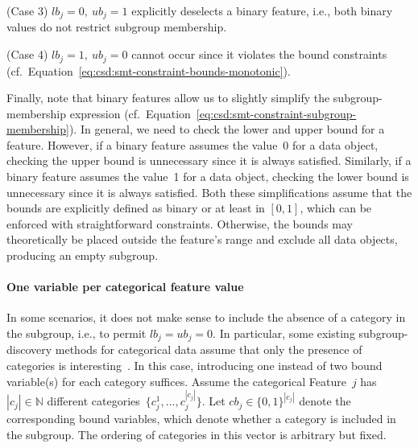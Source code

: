 \documentclass{article}
\theoremstyle{definition}
\begin{document}
(Case 3) $\mathit{lb}_j = 0,~\mathit{ub}_j = 1$ explicitly deselects a binary feature, i.e., both binary values do not restrict subgroup membership.

(Case 4) $\mathit{lb}_j = 1,~\mathit{ub}_j = 0$ cannot occur since it violates the bound constraints (cf.~Equation~\ref{eq:csd:smt-constraint-bounds-monotonic}).

Finally, note that binary features allow us to slightly simplify the subgroup-membership expression (cf.~Equation~\ref{eq:csd:smt-constraint-subgroup-membership}).
In general, we need to check the lower and upper bound for a feature.
However, if a binary feature assumes the value~0 for a data object, checking the upper bound is unnecessary since it is always satisfied.
Similarly, if a binary feature assumes the value~1 for a data object, checking the lower bound is unnecessary since it is always satisfied.
Both these simplifications assume that the bounds are explicitly defined as binary or at least in $[0, 1]$, which can be enforced with straightforward constraints.
Otherwise, the bounds may theoretically be placed outside the feature's range and exclude all data objects, producing an empty subgroup.

\paragraph{One variable per categorical feature value}

In some scenarios, it does not make sense to include the absence of a category in the subgroup, i.e., to permit $\mathit{lb}_j = \mathit{ub}_j = 0$.
In particular, some existing subgroup-discovery methods for categorical data assume that only the presence of categories is interesting~\cite{atzmueller2015subgroup}.
In this case, introducing one instead of two bound variable(s) for each category suffices.
Assume the categorical Feature~$j$ has $|c_j| \in \mathbb{N}$ different categories~$\{c^1_j, \dots, c^{|c_j|}_j\}$.
Let $\mathit{cb}_j \in \{0, 1\}^{|c_j|}$ denote the corresponding bound variables, which denote whether a category is included in the subgroup.
The ordering of categories in this vector is arbitrary but fixed.
\end{document}
